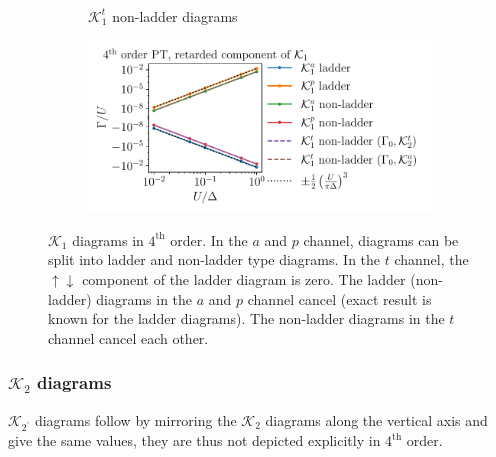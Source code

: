 \documentclass[10pt]{scrartcl}
\newcommand{\Ktot}[1]{\mathcal{K}_#1}
\newcommand{\K}[2]{\mathcal{K}_#1^#2}
\begin{document}
\begin{figure}[h!]
\begin{subfigure}[c]{0.4\textwidth}
\\
\phantom{.}\hspace{1.1cm} $\K1t$ non-ladder diagrams
\end{subfigure}
\begin{subfigure}[c]{0.4\textwidth}
\includegraphics[scale=0.65]{plots/PT4_K1}
\end{subfigure}
\caption{$\Ktot1$ diagrams in $4^\text{th}$ order. In the $a$ and $p$ channel, diagrams can be split into ladder and non-ladder type diagrams. In the $t$ channel, the $\uparrow\downarrow$ component of the ladder diagram is zero. 
The ladder (non-ladder) diagrams in the $a$ and $p$ channel cancel (exact result is known for the ladder diagrams). The non-ladder diagrams in the $t$ channel cancel each other.}
\end{figure}

\subsubsection*{$\mathcal{K}_2$ diagrams}

$\Ktot{{2^{\prime}}}$ diagrams follow by mirroring the $\Ktot2$ diagrams along the vertical axis and give the same values, they are thus not depicted explicitly in $4^\text{th}$ order.
\end{document}
